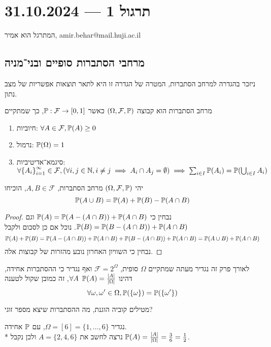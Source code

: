 \section{תרגול 1 --- 31.10.2024}
המתרגל הוא אמיר, amir.behar@mail.huji.ac.il

\subsection{מרחבי הסתברות סופיים ובני־מניה}
ניזכר בהגדרה למרחב הסתברות, המטרה של הגדרה זו היא לתאר תוצאות אפשריות של מצב נתון.
\begin{definition}
	מרחב הסתברות הוא קבוצה $(\Omega, \mathcal{F}, \mathbb{P})$ כאשר $\mathbb{P} : \mathcal{F} \to [0, 1]$, כך שמתקיים
	\begin{enumerate}
		\item חיוביות: $\forall A \in \mathcal{F}, \mathbb{P}(A) \ge 0$
		\item נרמול: $\mathbb{P}(\Omega) = 1$
		\item סיגמא־אדיטיביות: $\forall {\{ A_i \}}_{i = 1}^\infty \in \mathcal{F}, (\forall i, j \in \mathbb{N}, i \ne j \implies A_i \cap A_j = \emptyset) \implies \sum_{i \in I} \mathbb{P}(A_i) = \mathbb{P}(\bigcup_{i \in I} A_i )$
	\end{enumerate}
\end{definition}
\begin{exercise}
	יהי $(\Omega, \mathcal{F}, \mathbb{P})$ מרחב הסתברות, $A, B \in \mathcal{F}$, הוכיחו
	\[
		\mathbb{P}(A \cup B) = \mathbb{P}(A) + \mathbb{P}(B) - \mathbb{P}(A \cap B)
	\]
\end{exercise}
\begin{proof}
	נבחין כי $\mathbb{P}(A) = \mathbb{P}(A - (A \cap B)) + \mathbb{P}(A \cap B)$ וגם $\mathbb{P}(B) = \mathbb{P}(B - (A \cap B)) + \mathbb{P}(A \cap B)$. נוכל אם כן לסכום ולקבל
	\[
		\mathbb{P}(A) + \mathbb{P}(B) = \mathbb{P}(A - (A \cap B)) + \mathbb{P}(A \cap B) + \mathbb{P}(B - (A \cap B)) + \mathbb{P}(A \cap B)
		= \mathbb{P}(A \cup B) + \mathbb{P}(A \cap B)
	\]
	נבחין כי השוויון האחרון נובע מהזרות של קבוצות אלה.
\end{proof}
לאורך פרק זה נגדיר מעתה שמתקיים $\Omega$ סופית, $\mathcal{F} = 2^\Omega$ ואף נגדיר כי ההסתברות אחידה, דהינו $\forall A \enspace \mathbb{P}(A) = \frac{|A|}{|\Omega|}$, זה כמובן שקול לטענה
\[
	\forall \omega, \omega' \in \Omega, \mathbb{P}(\{\omega\}) = \mathbb{P}(\{\omega'\})
\]
\begin{exercise}
	מטילים קוביה הוגנת, מה ההסתברות שיצא מספר זוגי?
\end{exercise}
\begin{solution}
	נגדיר $\Omega = [6] = \{1, \dots, 6\}$, עם $\mathbb{P}$ אחידה. \\*
	נרצה לחשב את $A = \{2, 4, 6\}$ ולכן נקבל $\mathbb{P}(A) = \frac{|A|}{|\Omega|} = \frac{3}{6} = \frac{1}{2}$.
\end{solution}
